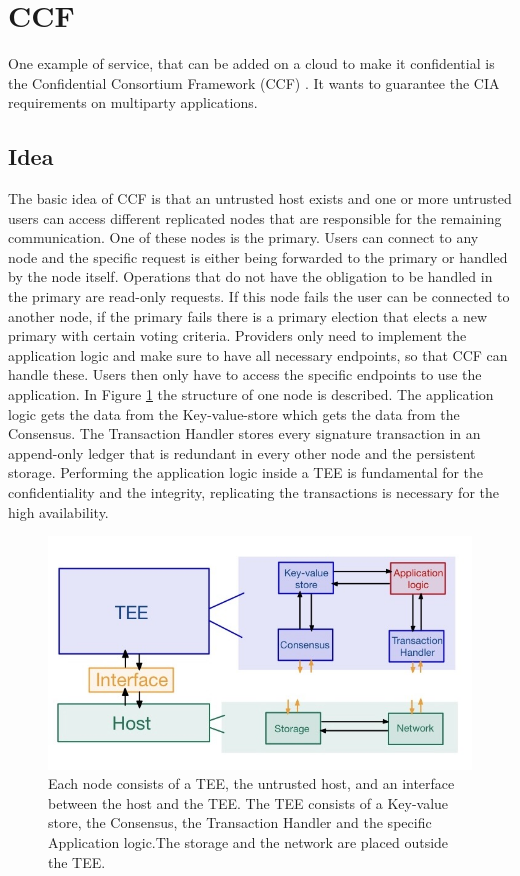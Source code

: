 \section{CCF}
One example of service, that can be added on a cloud to make it confidential is the Confidential Consortium Framework (CCF) \cite{Howard}. It wants to guarantee the CIA requirements on multiparty applications.
\subsection{Idea}
The basic idea of CCF is that an untrusted host exists and one or more untrusted users can access different replicated nodes that are responsible for the remaining communication. One of these nodes is the primary. Users can connect to any node and the specific request is either being forwarded to the primary or handled by the node itself. Operations that do not have the obligation to be handled in the primary are read-only requests. If this node fails the user can be connected to another node, if the primary fails there is a primary election that elects a new primary with certain voting criteria. Providers only need to implement the application logic and make sure to have all necessary endpoints, so that CCF can handle these. Users then only have to access the specific endpoints to use the application.  In Figure \ref{ccf} the structure of one node is described. The application logic gets the data from the Key-value-store which gets the data from the Consensus. The Transaction Handler stores every signature transaction in an append-only ledger that is redundant in every other node and the persistent storage. Performing the application logic inside a TEE is fundamental for the confidentiality and the integrity, replicating the transactions is necessary for the high availability.
\begin{figure}[h]
	\includegraphics[scale=0.35]{pictures/basic_ccf}
	\caption{Each node consists of a TEE, the untrusted host, and an interface between the host and the TEE. The TEE consists of a Key-value store, the Consensus, the Transaction Handler and the specific Application logic.The storage and the network are placed outside the TEE.}
	\label{ccf}
\end{figure}
